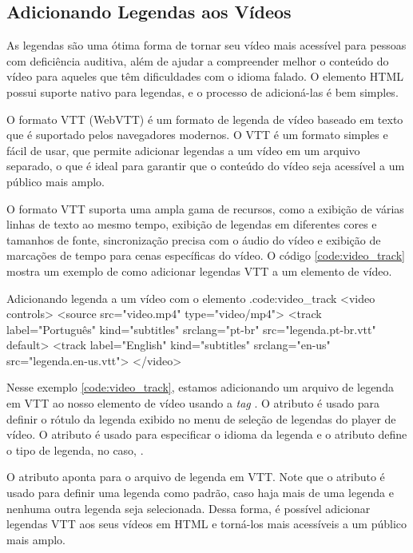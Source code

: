 \subsection{Adicionando Legendas aos Vídeos}

As legendas são uma ótima forma de tornar seu vídeo mais acessível para pessoas com deficiência auditiva, além de ajudar a compreender melhor o conteúdo do vídeo para aqueles que têm dificuldades com o idioma falado. O elemento HTML  possui suporte nativo para legendas, e o processo de adicioná-las é bem simples.

O formato VTT (WebVTT) é um formato de legenda de vídeo baseado em texto que é suportado pelos navegadores modernos. O VTT é um formato simples e fácil de usar, que permite adicionar legendas a um vídeo em um arquivo separado, o que é ideal para garantir que o conteúdo do vídeo seja acessível a um público mais amplo.

O formato VTT suporta uma ampla gama de recursos, como a exibição de várias linhas de texto ao mesmo tempo, exibição de legendas em diferentes cores e tamanhos de fonte, sincronização precisa com o áudio do vídeo e exibição de marcações de tempo para cenas específicas do vídeo. O código \ref{code:video_track} mostra um exemplo de como adicionar legendas VTT a um elemento de vídeo.

\begin{htmlcode}{Adicionando legenda a um vídeo com o elemento .}{code:video_track}
<video controls>
    <source src="video.mp4" type="video/mp4">
    <track label="Português" kind="subtitles" srclang="pt-br" 
        src="legenda.pt-br.vtt" default>
    <track label="English" kind="subtitles" srclang="en-us" 
        src="legenda.en-us.vtt">
</video>
\end{htmlcode}

Nesse exemplo \ref{code:video_track}, estamos adicionando um arquivo de legenda em VTT ao nosso elemento de vídeo usando a \textit{tag} . O atributo  é usado para definir o rótulo da legenda exibido no menu de seleção de legendas do player de vídeo. O atributo  é usado para especificar o idioma da legenda e o atributo  define o tipo de legenda, no caso, .

O atributo  aponta para o arquivo de legenda em VTT. Note que o atributo  é usado para definir uma legenda como padrão, caso haja mais de uma legenda e nenhuma outra legenda seja selecionada. Dessa forma, é possível adicionar legendas VTT aos seus vídeos em HTML e torná-los mais acessíveis a um público mais amplo.

